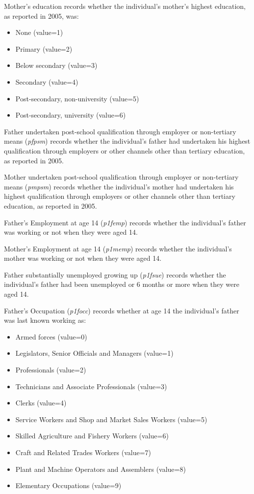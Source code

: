 \documentclass[12pt, a4paper]{article}
\begin{document}
Mother’s education records whether the individual’s mother’s highest education, as reported in 2005, was:
\begin{itemize}
  \item None (value=1)
  \item Primary (value=2)
  \item Below secondary (value=3)
  \item Secondary (value=4)
  \item Post-secondary, non-university (value=5)
  \item Post-secondary, university (value=6)
\end{itemize}  

Father undertaken post-school qualification through employer or non-tertiary means (\textit{p\textunderscore{}fpsm}) records whether the individual’s father had undertaken his highest qualification through employers or other channels other than tertiary education, as reported in 2005. 

Mother undertaken post-school qualification through employer or non-tertiary means (\textit{p\textunderscore{}mpsm}) records whether the individual’s mother had undertaken his highest qualification through employers or other channels other than tertiary education, as reported in 2005. 

Father’s Employment at age 14 (\textit{p1\textunderscore{}femp}) records whether the individual’s father was working or not when they were aged 14. 

Mother’s Employment at age 14 (\textit{p1\textunderscore{}memp}) records whether the individual’s mother was working or not when they were aged 14.

Father substantially unemployed growing up (\textit{p1\textunderscore{}fsue}) records whether the individual’s father had been unemployed or 6 months or more when they were aged 14. 

Father’s Occupation (\textit{p1\textunderscore{}focc}) records whether at age 14 the individual’s father was last known working as:
\begin{itemize}
  \item Armed forces (value=0)
  \item Legislators, Senior Officials and Managers (value=1)
  \item Professionals (value=2)
  \item Technicians and Associate Professionals (value=3)
  \item Clerks (value=4)
  \item Service Workers and Shop and Market Sales Workers (value=5)
  \item Skilled Agriculture and Fishery Workers (value=6)
  \item Craft and Related Trades Workers (value=7)
  \item Plant and Machine Operators and Assemblers (value=8)
  \item Elementary Occupations (value=9)
\end{itemize}  
\end{document}
